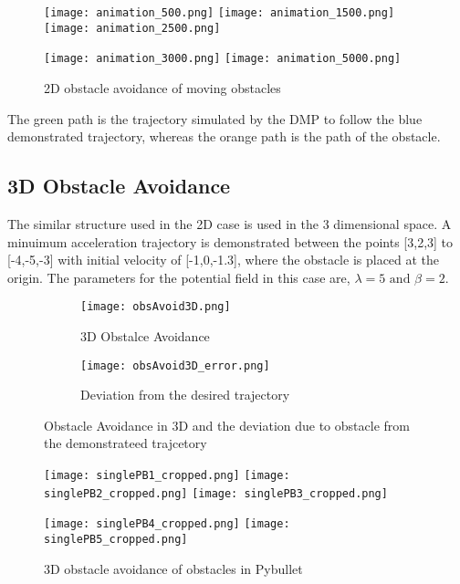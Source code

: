 \begin{figure}[!htp]
    \centering
    \texttt{[image: animation\_500.png]}\quad
    \texttt{[image: animation\_1500.png]}\quad
    \texttt{[image: animation\_2500.png]}

    \medskip

    \texttt{[image: animation\_3000.png]}\quad
    \texttt{[image: animation\_5000.png]}

    \caption{2D obstacle avoidance of moving obstacles}
    \label{fig:2D_moveObs}
\end{figure}
The green path is the trajectory simulated by the DMP to follow the blue demonstrated trajectory, whereas the orange path is the path of the obstacle.




\subsection{3D Obstacle Avoidance}
The similar structure used in the 2D case is used in the 3 dimensional space. A minuimum acceleration trajectory is demonstrated 
between the points [3,2,3] to [-4,-5,-3] with initial velocity of [-1,0,-1.3], where the obstacle is placed at the origin. The 
parameters for the potential field in this case are, $\lambda = 5 \text{ and } \beta = 2$.

\begin{figure}[!htp]
    \centering
    \begin{subfigure}{0.5\textwidth}
        \texttt{[image: obsAvoid3D.png]}
        \caption{3D Obstalce Avoidance}
        \label{fig:obsAvoid3D}
    \end{subfigure}%
    \begin{subfigure}{0.5\textwidth}
        \centering
        \texttt{[image: obsAvoid3D\_error.png]}
        \caption{Deviation from the desired trajectory}
        \label{fig:obsAvoid3D_error}
    \end{subfigure}
    \caption{Obstacle Avoidance in 3D and the deviation due to obstacle from the demonstrateed trajcetory}
    \label{fig:obsAvoid3Dfar}
\end{figure}







\begin{figure}[!htp]
    \centering
    \texttt{[image: singlePB1\_cropped.png]}\quad
    \texttt{[image: singlePB2\_cropped.png]}\quad
    \texttt{[image: singlePB3\_cropped.png]}

    \medskip

    \texttt{[image: singlePB4\_cropped.png]}\quad
    \texttt{[image: singlePB5\_cropped.png]}

    \caption{3D obstacle avoidance of obstacles in Pybullet}
    \label{fig:pybulletsingleObs}
\end{figure}




